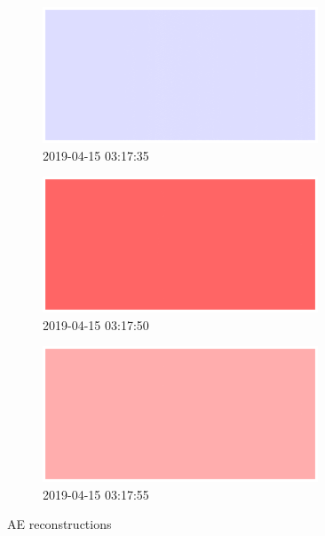 \clearpage
\begin{figure}[p]
\centering
\begin{subfigure}{\textwidth}
    \centering
    \includegraphics[width=0.9\textwidth]{figures/anomalies/ae/20190415_031735.png}
    \caption{2019-04-15 03:17:35}
\end{subfigure}
\vspace{1em}
\begin{subfigure}{\textwidth}
    \centering
    \includegraphics[width=0.9\textwidth]{figures/anomalies/ae/20190415_031750.png}
    \caption{2019-04-15 03:17:50}
\end{subfigure}
\vspace{1em}
\begin{subfigure}{\textwidth}
    \centering
    \includegraphics[width=0.9\textwidth]{figures/anomalies/ae/20190415_031755.png}
    \caption{2019-04-15 03:17:55}
\end{subfigure}
\caption{AE reconstructions}
\label{fig:ae_reconstructions}
\end{figure}
